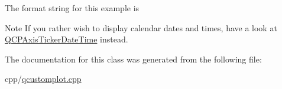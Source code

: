 The format string for this example is 
\begin{DoxyCodeInclude}
\end{DoxyCodeInclude}
 \begin{DoxyNote}{Note}
If you rather wish to display calendar dates and times, have a look at \mbox{\hyperlink{class_q_c_p_axis_ticker_date_time}{Q\+C\+P\+Axis\+Ticker\+Date\+Time}} instead. 
\end{DoxyNote}


The documentation for this class was generated from the following file\+:\begin{DoxyCompactItemize}
\item 
cpp/\mbox{\hyperlink{qcustomplot_8cpp}{qcustomplot.\+cpp}}\end{DoxyCompactItemize}
